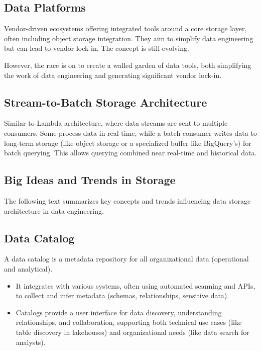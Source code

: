 \subsection*{Data Platforms}
Vendor-driven ecosystems offering integrated tools around a core
storage layer, often including object storage integration.
They aim to simplify data engineering but can lead to vendor
lock-in. The concept is still evolving.

However, the race is on to create a walled garden of data tools,
both simplifying the work of data engineering and generating
significant vendor lock-in.



\subsection*{Stream-to-Batch Storage Architecture}
Similar to Lambda architecture, where data streams are sent to
multiple consumers. Some process data in real-time, while a batch
consumer writes data to long-term storage (like object storage or
a specialized buffer like BigQuery's) for batch querying. This
allows querying combined near real-time and historical data.











\subsection{Big Ideas and Trends in Storage}
The following text summarizes key concepts and trends influencing data
storage architecture in data engineering.



\subsection*{Data Catalog}
A data catalog is a metadata repository for all organizational data
(operational and analytical).
\begin{itemize}
    \item  It integrates with various systems, often using automated
    scanning and APIs, to collect and infer metadata
    (schemas, relationships, sensitive data).
    
    \item Catalogs provide a user interface for data discovery,
    understanding relationships, and collaboration, supporting both
    technical use cases (like table discovery in lakehouses) and
    organizational needs (like data search for analysts).
\end{itemize}


